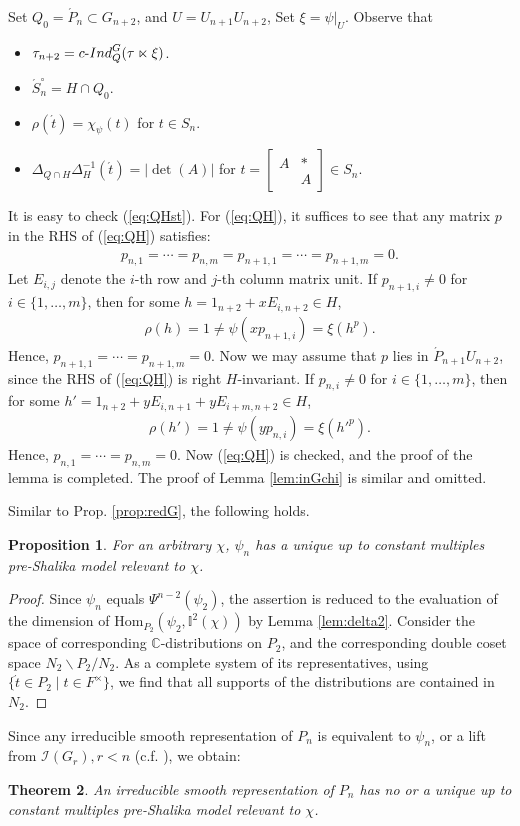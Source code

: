 \documentclass[11pt]{amsart}
\newcommand\C{{\mathbb{C}}}%
\newcommand\Ib{{\mathbb{I}}}
\newcommand\1{\mathbf{1}}
\newcommand\nid{\noindent}
\newcommand\ac{\acute}
\newcommand\lt{\ltimes}%
\newcommand\bs{\backslash}%
\newcommand\Hom{{\mathrm{Hom}}}%
\newcommand\cI{{\rm c\mathchar`- Ind}}
\newcommand\tm{\times}
\newcommand\Ir{{\mathscr{I}}}
\numberwithin{equation}{section}
\newtheorem{thm}{Theorem}[section]
\newtheorem{prop}[thm]{Proposition}
\begin{document}
Set $Q_0 = \ac{P}_{n} \subset G_{n+2}$, and $U = U_{n+1}U_{n+2}$,
Set $\xi = \psi|_U$. 
Observe that
\begin{itemize}
\item $\tau_{n+2} = \cI_Q^G(\tau \lt \xi)$.
\item $\ac{S}_{n}^\circ = H \cap Q_0$.
\item $\rho(\ac{t}) = \chi_\psi(t)$ for $t \in S_{n}$.
\item $\Delta_{Q \cap H}\Delta_H^{-1}(\ac{t})=|\det(A)|$ for 
$t = \begin{bmatrix}
A & * \\
& A  
\end{bmatrix} \in S_{n}$.
\end{itemize}
It is easy to check (\ref{eq:QHst}).
For (\ref{eq:QH}), it suffices to see that any matrix $p$ in the RHS of (\ref{eq:QH}) satisfies: 
\begin{align*}
p_{n,1} = \cdots = p_{n, m} = p_{n+1,1} = \cdots = p_{n+1, m} = 0.
\end{align*} 
Let $E_{i,j}$ denote the $i$-th row and $j$-th column matrix unit.
If $p_{n+1,i} \neq 0$ for $i \in \{1, \ldots, m\}$, then for some $h = 1_{n+2} + x E_{i,n+2} \in H$,  
\begin{align*}
\rho(h) = 1 \neq \psi(x p_{n+1,i}) = \xi(h^p).
\end{align*} 
Hence, $p_{n+1,1} = \cdots = p_{n+1, m} = 0$.
Now we may assume that $p$ lies in $\ac{P}_{n+1}U_{n+2}$, since the RHS of (\ref{eq:QH}) is right $H$-invariant.
If $p_{n,i} \neq 0$ for $i \in \{1, \ldots, m\}$, then for some $h'= 1_{n+2} + y E_{i,n+1} + yE_{i+ m,n+2} \in H$, 
\begin{align*}
\rho(h') = 1 \neq \psi(y p_{n,i}) = \xi(h'^p).
\end{align*} 
Hence, $p_{n,1} = \cdots = p_{n, m} = 0$.
Now (\ref{eq:QH}) is checked, and the proof of the lemma is completed.
The proof of Lemma \ref{lem:inGchi} is similar and omitted.

Similar to Prop. \ref{prop:redG}, the following holds.
\begin{prop}\label{prop:red0}
For an arbitrary $\chi$, $\psi_{n}$ has a unique up to constant multiples pre-Shalika model relevant to $\chi$. 
\end{prop}
\begin{proof}
Since $\psi_{n}$ equals $\Psi^{n-2}(\psi_2)$,  the assertion is reduced to the evaluation of the dimension of $\Hom_{P_{2}}(\psi_2, \Ib^{2}(\chi))$ by Lemma \ref{lem:delta2}. 
Consider the space of corresponding $\C$-distributions on $P_2$, and the corresponding double coset space $N_2 \bs P_2 /N_2$.
As a complete system of its representatives, using $\{\ac{t} \in P_2 \mid t \in F^\tm \}$, we find that all supports of the distributions are contained in $N_2$.
\end{proof}
\nid
Since any irreducible smooth representation of $P_n$ is equivalent to $\psi_n$, or a lift from $\Ir(G_{r}), r < n$ (c.f. \cite{B-Z}), we obtain:
\begin{thm}\label{thm:1dimprtau}
An irreducible smooth representation of $P_{n}$ has no or a unique up to constant multiples pre-Shalika model relevant to $\chi$.
\end{thm}
\end{document}

